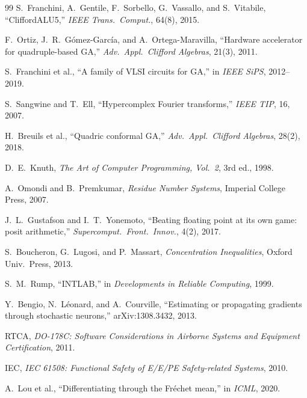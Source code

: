 \documentclass[11pt,a4paper]{article}
\theoremstyle{definition}
\theoremstyle{plain}
\theoremstyle{remark}
\begin{document}
\begin{thebibliography}{99}
S.~Franchini, A.~Gentile, F.~Sorbello, G.~Vassallo, and S.~Vitabile,
``CliffordALU5,'' \emph{IEEE Trans.\ Comput.}, 64(8), 2015.

F.~Ortiz, J.~R.~G\'{o}mez-Garc\'{i}a, and A.~Ortega-Maravilla,
``Hardware accelerator for quadruple-based GA,''
\emph{Adv.\ Appl.\ Clifford Algebras}, 21(3), 2011.

S.~Franchini et al.,
``A family of VLSI circuits for GA,'' in \emph{IEEE SiPS}, 2012--2019.

S.~Sangwine and T.~Ell,
``Hypercomplex Fourier transforms,'' \emph{IEEE TIP}, 16, 2007.

H.~Breuils et al., ``Quadric conformal GA,''
\emph{Adv.\ Appl.\ Clifford Algebras}, 28(2), 2018.

D.~E.~Knuth,
\emph{The Art of Computer Programming, Vol.\ 2}, 3rd ed., 1998.

A.~Omondi and B.~Premkumar,
\emph{Residue Number Systems}, Imperial College Press, 2007.

J.~L.~Gustafson and I.~T.~Yonemoto,
``Beating floating point at its own game: posit arithmetic,''
\emph{Supercomput.\ Front.\ Innov.}, 4(2), 2017.

S.~Boucheron, G.~Lugosi, and P.~Massart,
\emph{Concentration Inequalities}, Oxford Univ.\ Press, 2013.

S.~M.~Rump, ``INTLAB,'' in \emph{Developments in Reliable Computing}, 1999.


Y.~Bengio, N.~L\'{e}onard, and A.~Courville,
``Estimating or propagating gradients through stochastic neurons,''
arXiv:1308.3432, 2013.

RTCA, \emph{DO-178C: Software Considerations in Airborne Systems and Equipment Certification}, 2011.

IEC, \emph{IEC 61508: Functional Safety of E/E/PE Safety-related Systems}, 2010.

A.~Lou et al.,
``Differentiating through the Fr\'echet mean,'' in \emph{ICML}, 2020.

\end{thebibliography}
\end{document}
